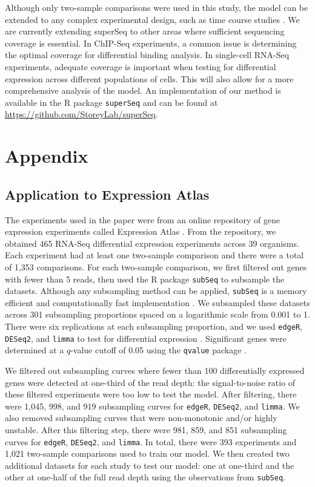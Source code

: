 \documentclass[11pt]{article}
\begin{document}
Although only two-sample comparisons were used in this study, the model can be extended to any complex experimental design, such as time course studies \cite{Storey2005}. We are currently extending superSeq to other areas where sufficient sequencing coverage is essential. In ChIP-Seq experiments, a common issue is determining the optimal coverage for differential binding analysis. In single-cell RNA-Seq experiments, adequate coverage is important when testing for differential expression across different populations of cells. This will also allow for a more comprehensive analysis of the model. An implementation of our method is available in the R package {\tt superSeq} and can be found at \url{https://github.com/StoreyLab/superSeq}.

\newpage 

\section*{Appendix\label{Sec:methods}}

\subsection{Application to Expression Atlas\label{Subsec:application}}

The experiments used in the paper were from an online repository of gene expression experiments called Expression Atlas \cite{petryszak:2014}. From the repository, we obtained 465 RNA-Seq differential expression experiments across 39 organisms. Each experiment had at least one two-sample comparison and there were a total of 1,353 comparisons. For each two-sample comparison, we first filtered out genes with fewer than 5 reads, then used the R package {\tt subSeq} to subsample the datasets. Although any subsampling method can be applied, \texttt{subSeq} is a memory efficient and computationally fast implementation \cite{Robinson:2014ho}. We subsampled these datasets across 301 subsampling proportions spaced on a logarithmic scale from 0.001 to 1. There were six replications at each subsampling proportion, and we used \texttt{edgeR}, \texttt{DESeq2}, and \texttt{limma} to test for differential expression \cite{Law:2014,robinson:2010,Love:2014}. Significant genes were determined at a $q$-value cutoff of 0.05 using the {\tt qvalue} package \cite{qvaluePkg}.

We filtered out subsampling curves where fewer than 100 differentially expressed genes were detected at one-third of the read depth: the signal-to-noise ratio of these filtered experiments were too low to test the model. After filtering, there were 1,045, 998, and 919 subsampling curves for \texttt{edgeR}, \texttt{DESeq2}, and \texttt{limma}. We also removed subsampling curves that were non-monotonic and/or highly unstable. After this filtering step, there were 981, 859, and 851 subsampling curves for \texttt{edgeR}, \texttt{DESeq2}, and \texttt{limma}. In total, there were 393 experiments and 1,021 two-sample comparisons used to train our model. We then created two additional datasets for each study to test our model: one at one-third and the other at one-half of the full read depth using the observations from {\tt subSeq}.
\end{document}

